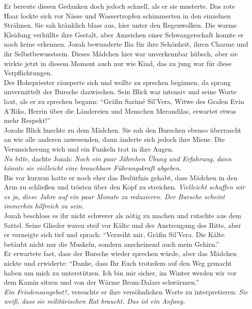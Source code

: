 Er bereute diesen Gedanken doch jedoch schnell, als er sie musterte. Das rote Haar lockte sich 
vor Nässe und Wassertropfen schimmerten in den einzelnen Strähnen. Sie sah kränklich blass aus, 
hier unter den Regenwolken. Die warme Kleidung verhüllte ihre Gestalt, aber Anzeichen einer 
Schwangerschaft konnte er noch keine erkennen. Jozah bewunderte Ilia für ihre Schönheit, ihren 
Charme und ihr Selbstbewusstsein. Dieses Mädchen hier war unverkennbar hübsch, aber sie wirkte 
jetzt in diesem Moment auch nur wie Kind, das zu jung war für diese Verpflichtungen.\\
Der Hohepriester räusperte sich und wollte zu sprechen beginnen, da sprang unvermittelt der Bursche 
dazwischen. Sein Blick war intensiv und seine Worte laut, als er zu sprechen begann: ``Gräfin 
Sarimé Sil'Vera, Witwe des Grafen Evin A'Riks, Herrin über die Ländereien und Menschen Merandilas, 
erwartet etwas mehr Respekt!''\\
Jozahs Blick huschte zu dem Mädchen. Sie sah den Burschen ebenso überrascht an wie alle anderen 
anwesenden, dann änderte sich jedoch ihre Miene. Die Verunsicherung wich und ein Funkeln trat in 
ihre Augen.\\
\textit{Na bitte}, dachte Jozah: \textit{Noch ein paar Jährchen Übung und Erfahrung, dann könnte 
sie vielleicht eine brauchbare Führungskraft abgeben.}\\
Bis vor kurzem hatte er noch eher das Bedürfnis gehabt, dass Mädchen in den Arm zu schließen und 
trösten über den Kopf zu streichen. \textit{Vielleicht schaffen wir es ja, diese Jahre auf ein paar 
Monate zu reduzieren. Der Bursche scheint immerhin hilfreich zu sein.}\\
Jozah beschloss es ihr nicht schwerer als nötig zu machen und rutschte aus dem Sattel. Seine 
Glieder waren steif vor Kälte und der Anstrengung des Ritts, aber er verneigte sich tief und 
sprach: ``Verzeiht mir, Gräfin Sil'Vera. Die Kälte betäubt nicht nur die Muskeln, sondern 
anscheinend auch mein Gehirn.''\\
Er erwartete fast, dass der Bursche wieder sprechen würde, aber das Mädchen nickte und erwiderte: 
``Danke, dass Ihr Euch trotzdem auf den Weg gemacht haben um mich zu unterstützen. Ich bin mir 
sicher, im Winter werden wir vor dem Kamin sitzen und von der Wärme Brom-Dalars schwärmen.''\\
\textit{Ein Friedensangebot?}, versuchte er ihre versöhnlichen Worte zu interpretieren: \textit{Sie 
weiß, dass sie militärischen Rat braucht. Das ist ein Anfang.}\\
